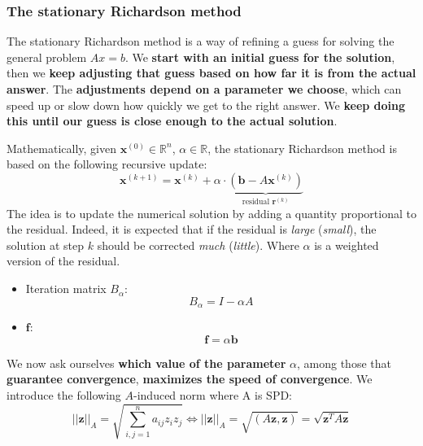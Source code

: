 \subsubsection{The stationary Richardson method}\label{subsubsection: The stationary Richardson method}

The stationary Richardson method is a way of refining a guess for solving the general problem $Ax = b$. We \textbf{start with an initial guess for the solution}, then we \textbf{keep adjusting that guess based on how far it is from the actual answer}. The \textbf{adjustments depend on a parameter we choose}, which can speed up or slow down how quickly we get to the right answer. We \textbf{keep doing this until our guess is close enough to the actual solution}.

\highspace
Mathematically, given $\mathbf{x}^{\left(0\right)} \in \mathbb{R}^{n}$, $\alpha \in \mathbb{R}$, the stationary Richardson method is based on the following recursive update:
\begin{equation}\label{eq: stationary richardson x calcolus}
    \mathbf{x}^{\left(k+1\right)} = \mathbf{x}^{\left(k\right)} + \alpha \cdot \underbrace{\left(\mathbf{b} - A\mathbf{x}^{\left(k\right)}\right)}_{\text{residual }\mathbf{r}^{\left(k\right)}}
\end{equation}
The idea is to update the numerical solution by adding a quantity proportional to the residual. Indeed, it is expected that if the residual is \emph{large} (\emph{small}), the solution at step $k$ should be corrected \emph{much} (\emph{little}). Where $\alpha$ is a weighted version of the residual.
\begin{itemize}
    \item Iteration matrix $B_{\alpha}$:
    \begin{equation*}
        B_{\alpha} = I - \alpha A
    \end{equation*}
    \item $\mathbf{f}$:
    \begin{equation*}
        \mathbf{f} = \alpha \mathbf{b}
    \end{equation*}
\end{itemize}
We now ask ourselves \textbf{which value of the parameter} $\alpha$, among those that \textbf{guarantee convergence}, \textbf{maximizes the speed of convergence}. We introduce the following $A$-induced norm where A is SPD:
\begin{equation*}
    {\left|\left|\mathbf{z}\right|\right|}_{A} = \sqrt{
        \displaystyle\sum_{i,j = 1}^{n} a_{ij}z_{i}z_{j}
    }
    \iff
    {\left|\left|\mathbf{z}\right|\right|}_{A} = \sqrt{\left(A\mathbf{z}, \mathbf{z}\right)} = \sqrt{\mathbf{z}^{T} A \mathbf{z}}
\end{equation*}
